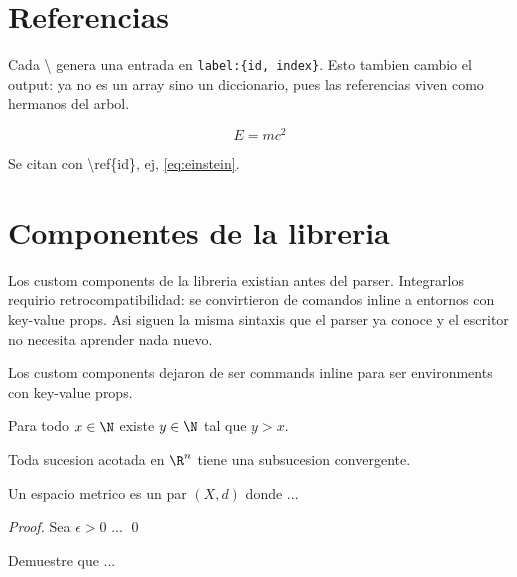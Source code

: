 \documentclass{article}
\begin{document}
  \section{ Referencias }

  Cada \backslash{}
  genera una entrada en \texttt{label:\{id, index\}}.
  Esto tambien cambio el output: ya no es un array sino un diccionario, pues
  las referencias viven como hermanos del arbol.

  \begin{equation}
      E = mc^2
  \end{equation}
  \label{eq:einstein}

  Se citan con \backslash ref\{id\}, ej, \ref{eq:einstein}.

  \section{ Componentes de la libreria }

  Los custom components de la libreria existian antes del parser. Integrarlos
  requirio retrocompatibilidad: se convirtieron de comandos inline a entornos
  con key-value props. Asi siguen la misma sintaxis que el parser ya conoce y
  el escritor no necesita aprender nada nuevo.

  \begin{axiom}
    Los custom components dejaron de ser commands inline para ser environments con key-value props.
  \end{axiom}

  \begin{axiom}[title=Arquimedes, label=ax-arq]
    Para todo $x \in \N$ existe $y \in \N$ tal que $y > x$.
  \end{axiom}

  \begin{theorem}
    Toda sucesion acotada en $\R^n$ tiene una subsucesion convergente.
  \end{theorem}

  \begin{definition}[title=Espacio metrico, label=def-met]
    Un espacio metrico es un par $(X, d)$ donde ...
  \end{definition}

  \begin{proof}
    Sea $\epsilon > 0$ ...
    \qed
  \end{proof}

  \begin{exercise}[label=ej-1]
    Demuestre que ...
  \end{exercise}
\end{document}
